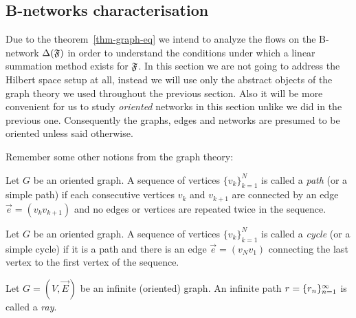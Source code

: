 \documentclass[12pt]{article}
\begin{document}
  \subsection{B-networks characterisation}
    Due to the theorem~\ref{thm-graph-eq} we intend to analyze the flows on the B-network
      $\Delta(\mathfrak{F})$ in order to understand the conditions under which a linear
      summation method exists for $\mathfrak{F}$.
    In this section we are not going to address the Hilbert space setup at all,
      instead we will use only the abstract objects of the graph theory
      we used throughout the previous section.
    Also it will be more convenient for us to study \emph{oriented} networks in this section unlike we
      did in the previous one.
    Consequently the graphs, edges and networks are presumed to be oriented unless said otherwise.

    Remember some other notions from the graph theory:
    \begin{definition}
      Let $G$ be an oriented graph.
      A sequence of vertices $\{v_k\}_{k=1}^N$ is called a \emph{path} (or a simple path) if each consecutive vertices
        $v_k$ and $v_{k+1}$ are connected by an edge $\vec{e} = (v_k v_{k+1})$ and no edges or vertices are repeated twice in the sequence.
    \end{definition}
    \begin{definition}
      Let $G$ be an oriented graph.
      A sequence of vertices $\{v_k\}_{k=1}^N$ is called a \emph{cycle} (or a simple cycle) if it is
        a path and there is an edge $\vec{e} = (v_N v_1)$ connecting the last vertex to the first vertex of the sequence.
    \end{definition}
    \begin{definition}
      Let $G = (V, \vec{E})$ be an infinite (oriented) graph.
      An infinite path $r = \{{r}_n\}_{n=1}^\infty$ is called a \emph{ray}.
    \end{definition}
\end{document}
